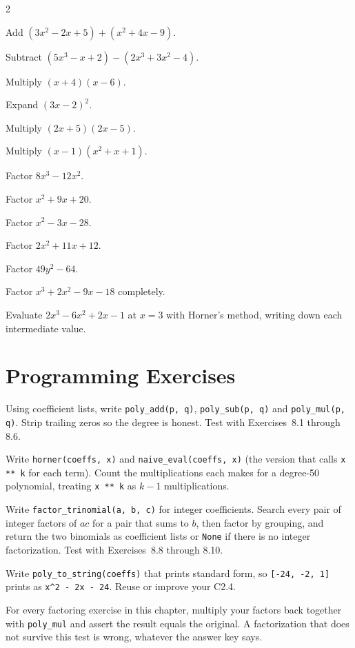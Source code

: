 \begin{multicols}{2}
\begin{exercises}
\item Add $(3x^2 - 2x + 5) + (x^2 + 4x - 9)$.
\item Subtract $(5x^3 - x + 2) - (2x^3 + 3x^2 - 4)$.
\item Multiply $(x + 4)(x - 6)$.
\item Expand $(3x - 2)^2$.
\item Multiply $(2x + 5)(2x - 5)$.
\item Multiply $(x - 1)(x^2 + x + 1)$.
\item Factor $8x^3 - 12x^2$.
\item Factor $x^2 + 9x + 20$.
\item Factor $x^2 - 3x - 28$.
\item Factor $2x^2 + 11x + 12$.
\item Factor $49y^2 - 64$.
\item Factor $x^3 + 2x^2 - 9x - 18$ completely.
\item Evaluate $2x^3 - 6x^2 + 2x - 1$ at $x = 3$ with Horner's method, writing down each intermediate value.
\end{exercises}
\end{multicols}

\section{Programming Exercises}

\begin{codeexercises}
\item Using coefficient lists, write \lstinline!poly_add(p, q)!, \lstinline!poly_sub(p, q)! and \lstinline!poly_mul(p, q)!. Strip trailing zeros so the degree is honest. Test with Exercises~8.1 through 8.6.
\item Write \lstinline!horner(coeffs, x)! and \lstinline!naive_eval(coeffs, x)! (the version that calls \lstinline!x ** k! for each term). Count the multiplications each makes for a degree-50 polynomial, treating \lstinline!x ** k! as $k - 1$ multiplications.
\item Write \lstinline!factor_trinomial(a, b, c)! for integer coefficients. Search every pair of integer factors of $ac$ for a pair that sums to $b$, then factor by grouping, and return the two binomials as coefficient lists or \lstinline!None! if there is no integer factorization. Test with Exercises~8.8 through 8.10.
\item Write \lstinline!poly_to_string(coeffs)! that prints standard form, so \lstinline![-24, -2, 1]! prints as \lstinline!x^2 - 2x - 24!. Reuse or improve your C2.4.
\item For every factoring exercise in this chapter, multiply your factors back together with \lstinline!poly_mul! and assert the result equals the original. A factorization that does not survive this test is wrong, whatever the answer key says.
\end{codeexercises}

